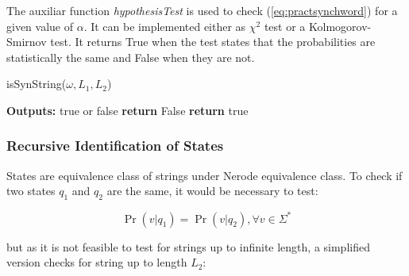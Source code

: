 {The auxiliar function \textit{hypothesisTest} is used to check (\ref{eq:practsynchword}) for a given value of $\alpha$. It can be implemented either as $\chi^2$ test or a Kolmogorov-Smirnov test. It returns True when the test states that the probabilities are statistically the same and False when they are not.
  
\begin{algorithm}[b]
\caption{isSynString($\omega, L_1, L_2$)\label{alg:issynstring}}
	\begin{algorithmic}[1]
	\State \textbf{Outputs:} true or false
						\State \textbf{return} False
					\EndIf
				\EndFor
			\EndFor
		\EndFor
	\EndFor
	\State \textbf{return} true
	\end{algorithmic}
\end{algorithm}

\subsubsection{Recursive Identification of States}

States are equivalence class of strings under Nerode equivalence class. To check if two states $q_1$ and $q_2$ are the same, it would be necessary to test:

\begin{equation}\label{eq:classeqprob}
\Pr(v|q_1) = \Pr(v|q_2), \forall v \in \Sigma^*
\end{equation}

\noindent but as it is not feasible to test for strings up to infinite length, a simplified version checks for string up to length $L_2$:

%
%

}
